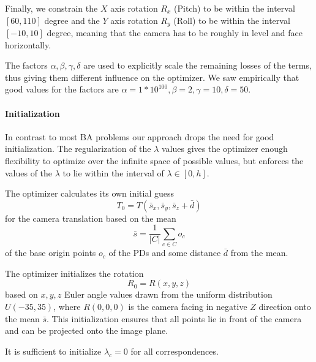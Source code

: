 Finally, we constrain the $X$ axis rotation $R_x$ (Pitch) to be within the interval $[60, 110]$ degree and the $Y$ axis rotation $R_y$ (Roll) to be within the interval $[-10, 10]$ degree, meaning that the camera has to be roughly in level and face horizontally.

The factors $\alpha, \beta, \gamma, \delta$ are used to explicitly scale the remaining losses of the terms, thus giving them different influence on the optimizer. 
We saw empirically that good values for the factors are $\alpha = 1*10^{100}, \beta = 2, \gamma = 10, \delta = 50$.

\paragraph{Initialization}
In contrast to most BA problems our approach drops the need for good initialization. 
The regularization of the $\lambda$ values gives the optimizer enough flexibility to optimize over the infinite space of possible values, but enforces the values of the $\lambda$ to lie within the interval of $\lambda \in [0, h]$.

The optimizer calculates its own initial guess
\begin{equation}
  T_0 = T(\bar{s}_x, \bar{s}_y, \bar{s}_z + \bar{d}) 
\end{equation}
for the camera translation based on the mean 
\begin{equation}
  \bar{s} = \frac{1}{\left\lvert C \right\rvert } \sum_{c \in C} o_c
\end{equation}
of the base origin points $o_c$ of the PDs and some distance $\bar{d}$ from the mean.

The optimizer initializes the rotation  
\begin{equation}
  R_0 = R(x, y, z)
\end{equation}
based on $x, y, z$ Euler angle values drawn from the uniform distribution $U(-35, 35)$, where $R(0,0,0)$ is the camera facing in negative $Z$ direction onto the mean $\bar{s}$.
This initialization ensures that all points lie in front of the camera and can be projected onto the image plane.

It is sufficient to initialize $\lambda_c = 0$ for all correspondences.
